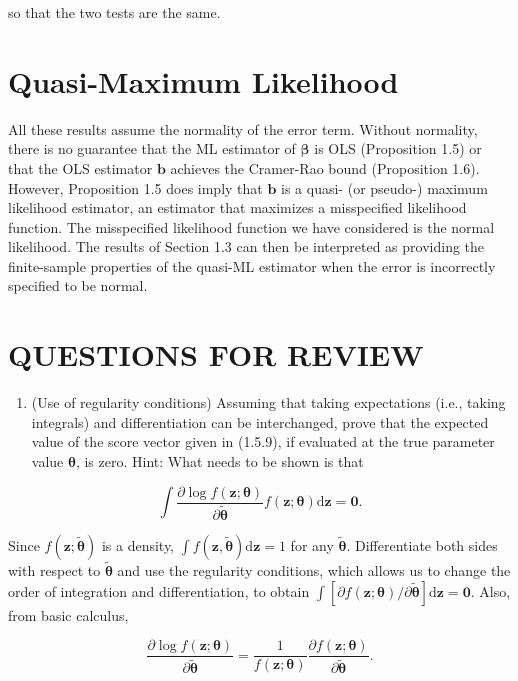 \documentclass[10pt]{article}
\begin{document}
so that the two tests are the same.

\section*{Quasi-Maximum Likelihood}
All these results assume the normality of the error term. Without normality, there is no guarantee that the ML estimator of $\boldsymbol{\beta}$ is OLS (Proposition 1.5) or that the OLS estimator $\mathbf{b}$ achieves the Cramer-Rao bound (Proposition 1.6). However, Proposition 1.5 does imply that $\mathbf{b}$ is a quasi- (or pseudo-) maximum likelihood estimator, an estimator that maximizes a misspecified likelihood function. The misspecified likelihood function we have considered is the normal likelihood. The results of Section 1.3 can then be interpreted as providing the finite-sample properties of the quasi-ML estimator when the error is incorrectly specified to be normal.

\section*{QUESTIONS FOR REVIEW}
\begin{enumerate}
  \item (Use of regularity conditions) Assuming that taking expectations (i.e., taking integrals) and differentiation can be interchanged, prove that the expected value of the score vector given in (1.5.9), if evaluated at the true parameter value $\boldsymbol{\theta}$, is zero. Hint: What needs to be shown is that
\end{enumerate}

$$
\int \frac{\partial \log f(\mathbf{z} ; \boldsymbol{\theta})}{\partial \tilde{\boldsymbol{\theta}}} f(\mathbf{z} ; \boldsymbol{\theta}) \mathrm{d} \mathbf{z}=\mathbf{0} .
$$

Since $f(\mathbf{z} ; \tilde{\boldsymbol{\theta}})$ is a density, $\int f(\mathbf{z}, \tilde{\boldsymbol{\theta}}) \mathrm{d} \mathbf{z}=1$ for any $\tilde{\boldsymbol{\theta}}$. Differentiate both sides with respect to $\tilde{\boldsymbol{\theta}}$ and use the regularity conditions, which allows us to change the order of integration and differentiation, to obtain $\int[\partial f(\mathbf{z} ; \boldsymbol{\theta}) / \partial \tilde{\boldsymbol{\theta}}] \mathrm{d} \mathbf{z}=\mathbf{0}$. Also, from basic calculus,

$$
\frac{\partial \log f(\mathbf{z} ; \boldsymbol{\theta})}{\partial \tilde{\boldsymbol{\theta}}}=\frac{1}{f(\mathbf{z} ; \boldsymbol{\theta})} \frac{\partial f(\mathbf{z} ; \boldsymbol{\theta})}{\partial \tilde{\boldsymbol{\theta}}} .
$$
\end{document}
